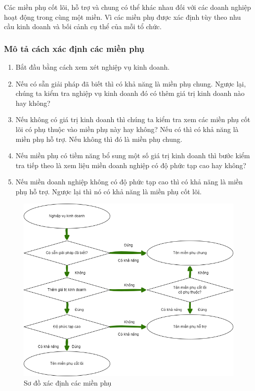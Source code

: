 Các miền phụ cốt lõi, hỗ trợ và chung có thể khác nhau đối với các doanh nghiệp hoạt động trong cùng một miền. Vì các miền phụ được xác định tùy theo nhu cầu kinh doanh và bối cảnh cụ thể của mỗi tổ chức.

\subsubsection{Mô tả cách xác định các miền phụ}

\begin{enumerate}

\item Bắt đầu bằng cách xem xét nghiệp vụ kinh doanh.

\item Nếu có sẵn giải pháp đã biết thì có khả năng là miền phụ chung. Ngược lại, chúng ta kiểm tra nghiệp vụ kinh doanh đó có thêm giá trị kinh doanh nào hay không?

\item Nếu không có giá trị kinh doanh thì chúng ta kiểm tra xem các miền phụ cốt lõi có phụ thuộc vào miền phụ này hay không? Nếu có thì có khả năng là miền phụ hỗ trợ. Nếu không thì đó là miền phụ chung.

\item Nếu miền phụ có tiềm năng bổ sung một số giá trị kinh doanh thì bước kiểm tra tiếp theo là xem liệu miền doanh nghiệp có độ phức tạp cao hay không?

\item Nếu miền doanh nghiệp không có độ phức tạp cao thì có khả năng là miền phụ hỗ trợ. Ngược lại thì nó có khả năng là miền phụ cốt lõi.

\end{enumerate}

\begin{figure}[h]

\centering

\includegraphics[scale = 0.5]{pictures/cach_xac_dinh_cac_mien_phu/main.drawio.png}

\caption{Sơ đồ xác định các miền phụ}

\end{figure}

